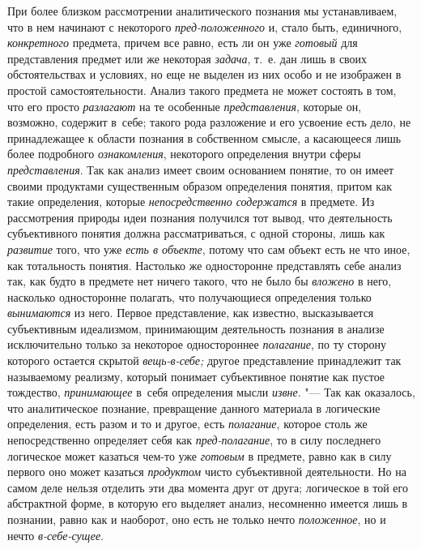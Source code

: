 При более близком рассмотрении аналитического познания мы
устанавливаем, что в нем начинают с некоторого
{\em пред-положенного}
и, стало быть, единичного,
{\em конкретного}
предмета, причем все равно, есть ли он уже
{\em готовый} для
представления предмет или же некоторая
{\em задача}, т.~е. дан
лишь в своих обстоятельствах и условиях, но еще не выделен из них особо и
не изображен в простой самостоятельности. Анализ такого предмета не может
состоять в том, что его просто
{\em разлагают} на те
особенные {\em представления},
которые он, возможно, содержит в~себе; такого рода разложение
и его усвоение есть дело, не принадлежащее к области познания в собственном
смысле, а касающееся лишь более подробного
{\em ознакомления},
некоторого определения внутри сферы
{\em представления}. Так
как анализ имеет своим основанием понятие, то он имеет своими продуктами
существенным образом определения понятия, притом как такие определения,
которые {\em непосредственно
содержатся} в предмете. Из рассмотрения природы идеи
познания получился тот вывод, что деятельность субъективного понятия должна
рассматриваться, с одной стороны, лишь как
{\em развитие} того, что
уже {\em есть в объекте},
потому что сам объект есть не что иное, как тотальность
понятия. Настолько же односторонне представлять себе анализ так, как будто
в предмете нет ничего такого, что не было бы
{\em вложено} в него,
насколько односторонне полагать, что получающиеся определения
только {\em вынимаются}
из него. Первое представление, как известно, высказывается
субъективным идеализмом, принимающим деятельность познания в анализе
исключительно только за некоторое одностороннее
{\em полагание}, по ту
сторону которого остается скрытой
{\em вещь-в-себе;} другое
представление принадлежит так называемому реализму, который понимает
субъективное понятие как пустое тождество,
{\em принимающее} в~себя
определения мысли {\em извне}. "---
Так как оказалось, что аналитическое познание, превращение
данного материала в логические определения, есть разом и то и другое, есть
{\em полагание}, которое
столь же непосредственно определяет себя как
{\em пред-полагание}, то
в силу последнего логическое может казаться чем-то уже
{\em готовым} в предмете,
равно как в силу первого оно может казаться
{\em продуктом} чисто
субъективной деятельности. Но на самом деле нельзя отделить эти два момента
друг от друга; логическое в той его абстрактной форме, в которую его
выделяет анализ, несомненно имеется лишь в познании, равно как и наоборот,
оно есть не только нечто
{\em положенное}, но и
нечто {\em в-себе-сущее}.

